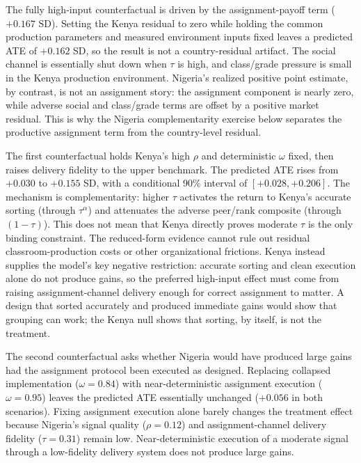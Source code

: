 \documentclass[11pt]{article}
\begin{document}
The fully high-input counterfactual is driven by the assignment-payoff term ($+0.167$ SD). Setting the Kenya residual to zero while holding the common production parameters and measured environment inputs fixed leaves a predicted ATE of $+0.162$ SD, so the result is not a country-residual artifact. The social channel is essentially shut down when $\tau$ is high, and class/grade pressure is small in the Kenya production environment. Nigeria's realized positive point estimate, by contrast, is not an assignment story: the assignment component is nearly zero, while adverse social and class/grade terms are offset by a positive market residual. This is why the Nigeria complementarity exercise below separates the productive assignment term from the country-level residual.



The first counterfactual holds Kenya's high $\rho$ and deterministic $\omega$ fixed, then raises delivery fidelity to the upper benchmark. The predicted ATE rises from $+0.030$ to $+0.155$ SD, with a conditional 90\% interval of $[+0.028,+0.206]$. The mechanism is complementarity: higher $\tau$ activates the return to Kenya's accurate sorting (through $\tau^\alpha$) and attenuates the adverse peer/rank composite (through $(1-\tau)$). This does not mean that Kenya directly proves moderate $\tau$ is the only binding constraint. The reduced-form evidence cannot rule out residual classroom-production costs or other organizational frictions. Kenya instead supplies the model's key negative restriction: accurate sorting and clean execution alone do not produce gains, so the preferred high-input effect must come from raising assignment-channel delivery enough for correct assignment to matter. A design that sorted accurately and produced immediate gains would show that grouping can work; the Kenya null shows that sorting, by itself, is not the treatment.

The second counterfactual asks whether Nigeria would have produced large gains had the assignment protocol been executed as designed. Replacing collapsed implementation ($\omega = 0.84$) with near-deterministic assignment execution ($\omega = 0.95$) leaves the predicted ATE essentially unchanged ($+0.056$ in both scenarios). Fixing assignment execution alone barely changes the treatment effect because Nigeria's signal quality ($\rho = 0.12$) and assignment-channel delivery fidelity ($\tau = 0.31$) remain low. Near-deterministic execution of a moderate signal through a low-fidelity delivery system does not produce large gains.
\end{document}
